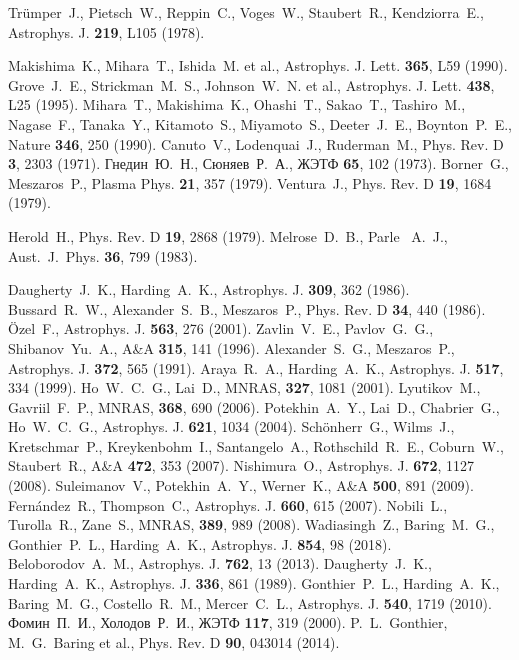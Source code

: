 \documentclass[cp1251%
               ]{jetp} %
\begin{document}
\begin{references}
%
 Tr\"{u}mper~J., Pietsch~W., Reppin~C., Voges~W., Staubert~R., Kendziorra~E., Astrophys. J. {\bf 219}, L105 (1978).
  
%
  Makishima~K., Mihara~T., Ishida~M. et al., Astrophys. J. Lett. {\bf 365}, L59 (1990).
%
  Grove~J.~E., Strickman~M.~S., Johnson~W.~N. et al., Astrophys. J. Lett. {\bf 438}, L25 (1995).
%
  Mihara~T., Makishima~K., Ohashi~T., Sakao~T., Tashiro~M., Nagase~F., Tanaka~Y., Kitamoto~S., Miyamoto~S., Deeter~J.~E., 
  Boynton~P.~E., Nature {\bf 346}, 250 (1990).
%
Canuto~V., Lodenquai~J., Ruderman~M., Phys. Rev. D {\bf 3}, 2303 (1971).
%
    Гнедин~Ю.~Н., Сюняев~Р.~А., ЖЭТФ {\bf 65}, 102 (1973).
%
  Borner~G., Meszaros~P., Plasma Phys. {\bf 21}, 357 (1979).
%
  Ventura~J., Phys. Rev. D {\bf 19}, 1684 (1979).

%
   Herold~H., Phys. Rev. D {\bf 19}, 2868 (1979).
%
  Melrose~D.~B., Parle~ A.~J.,
   Aust.~J.~Phys. {\bf 36}, 799 (1983).

%
  Daugherty~J.~K., Harding~A.~K., Astrophys. J. {\bf 309}, 362 (1986).
%
Bussard~R.~W., Alexander~S.~B., Meszaros~P., Phys. Rev. D {\bf 34}, 440 (1986).
%
  {\"O}zel~F., Astrophys. J. {\bf 563}, 276 (2001).
%
  Zavlin~V.~E., Pavlov~G.~G., Shibanov~Yu.~A., A\&A {\bf 315}, 141 (1996).
%
   Alexander~S.~G., Meszaros~P.,  Astrophys. J. {\bf 372}, 565 (1991).
%
  Araya~R.~A., Harding~A.~K.,  Astrophys. J. {\bf 517}, 334 (1999).
%
  Ho~W.~C.~G., Lai~D., MNRAS, {\bf 327}, 1081 (2001).
%
   Lyutikov~M., Gavriil~F.~P., MNRAS, {\bf 368}, 690 (2006).
%
  Potekhin~A.~Y., Lai~D., Chabrier~G., Ho~W.~C.~G., Astrophys. J. {\bf 621}, 1034 (2004).
%
   Sch{\"o}nherr~G., Wilms~J., Kretschmar~P., Kreykenbohm~I., Santangelo~A., Rothschild~R.~E., Coburn~W., Staubert~R., 
   A{\&}A {\bf 472}, 353 (2007).
%
  Nishimura~O., Astrophys. J. {\bf 672}, 1127 (2008).
   Suleimanov~V., Potekhin~A.~Y., Werner~K., A{\&}A {\bf 500}, 891 (2009).
   Fern{\'a}ndez~R., Thompson~C., Astrophys. J. {\bf 660}, 615 (2007).
Nobili~L., Turolla~R., Zane~S., MNRAS, {\bf 389}, 989 (2008).
%
Wadiasingh~Z., Baring~M.~G., Gonthier~P.~L., Harding~A.~K., Astrophys. J. {\bf 854}, 98 (2018).
%
  Beloborodov~A.~M., Astrophys. J. {\bf 762}, 13 (2013).
%
  Daugherty~J.~K., Harding~A.~K., Astrophys. J. {\bf 336}, 861 (1989).
%
Gonthier~P.~L., Harding~A.~K., Baring~M.~G., Costello~R.~M., Mercer~C.~L., Astrophys. J. {\bf 540}, 1719 (2010).
%
Фомин~П.~И., Холодов~Р.~И., ЖЭТФ {\bf 117}, 319 (2000). 
%
P.~L.~Gonthier, M.~G.~Baring et al., 
   Phys. Rev. D {\bf 90},  043014 (2014).


\end{references}
\end{document}
